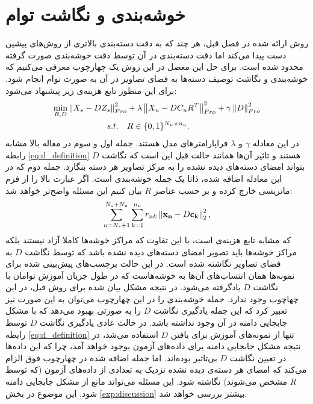 \section{خوشه‌بندی و نگاشت توام} \label{jeac}
روش ارائه شده در فصل قبل، هر چند که به دقت دسته‌بندی بالاتری از روش‌های پیشین دست پیدا می‌کند اما دقت دسته‌بندی در آن توسط دقت خوشه‌بندی صورت گرفته محدود شده است. برای حل این معضل در این روش یک چهارچوب معرفی می‌کنیم که خوشه‌بندی و نگاشت توصیف دسته‌ها به فضای تصاویر در آن به صورت توام انجام شود.
برای این منظور تابع هزینه‌ی زیر پیشنهاد می‌شود:
\begin{align}
\label{eq:joint}
 \min_{R,D} \left \lVert X_s - D Z_s \right \rVert_{Fro}^2  &+ \lambda \left \lVert X_u - D C_u R^T  \right \rVert_{Fro}^2 + \gamma \left \lVert D \right \rVert_{Fro}^2 \\
   s.t. \quad & R \in \{0,1\}^{N_u \times n_u}. \nonumber
\end{align}
در این معادله $\gamma$ و $\lambda$ فراپارامترهای مدل هستند. جمله اول و سوم در معاله بالا مشابه رابطه \eqref{eq:d_definition} هستند و تاثیر آن‌ها همانند حالت قبل این است که نگاشت $D$ بتواند امضای دسته‌های دیده نشده را به مرکز تصاویر هر دسته بنگارد. جمله دوم که در این معادله اضافه شده، ذاتا یک جمله خوشه‌بندی است. اگر عبارت بالا را از فرم ماتریسی خارج کرده و بر حسب عناصر $R$ بیان کنیم این مسئله واضح‌تر  خواهد شد:
\begin{equation}
\label{eq:essentialy_clustering}
\sum_{n=N_s+1}^{N_s + N_u} \sum_{k=1}^{n_u} r_{nk} \left \lVert \mathbf{x_n} - D \mathbf{c_k} \right \rVert_2^2,
\end{equation}
که مشابه تابع هزینه‌ی
است، با این تفاوت که مراکز خوشه‌ها کاملا آزاد نیستند بلکه مراکز خوشه‌ها باید تصویر امضای دسته‌های دیده نشده باشد که توسط نگاشت $D$ به فضای تصاویر نگاشته شده است. در این حالت برچسب‌های پیش‌بینی شده برای نمونه‌ها همان انتساب‌های آن‌ها به خوشه‌هاست که در طول جریان آموزش توامان با نگاشت $D$ یادگرفته می‌شود. در نتیجه مشکل بیان شده برای روش قبل، در این چهاچوب وجود ندارد. جمله خوشه‌بندی را در این چهارچوب می‌توان به این صورت نیز تعبیر کرد که این جمله یادگیری نگاشت $D$ را به صورتی بهبود می‌دهد که با مشکل جابجایی دامنه در آن وجود نداشته باشد. در حالت عادی یادگیری نگاشت $D$ توسط رابطه
\eqref{eq:d_definition}
تنها از نمونه‌های آموزش برای یافتن $D$ استفاده می‌شد، در نتیجه مشکل جابجایی دامنه برای داده‌های آزمون بوجود خواهد آمد، چرا که این داده‌ها در تعیین نگاشت $D$ بی‌تاثیر بوده‌اند. اما جمله اضافه شده در چهارچوب فوق الزام می‌کند که امضای هر دسته‌ی دیده نشده نزدیک به تعدادی از داده‌های آزمون (که توسط $R$ مشخص می‌شوند) نگاشته شود. این مسئله می‌تواند مانع از مشکل جابجایی دامنه شود. این موضوع در بخش
\ref{exp:discussion}
بیشتر بررسی خواهد شد.

